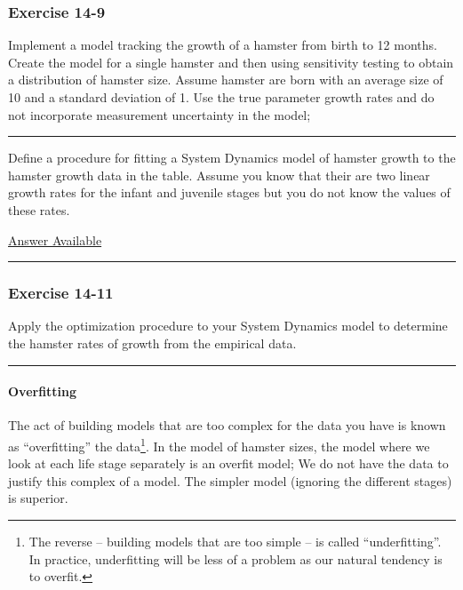 \documentclass[]{memoir}
\begin{document}
\subsubsection{Exercise 14-9}

Implement a model tracking the growth of a hamster from birth to 12
months. Create the model for a single hamster and then using sensitivity
testing to obtain a distribution of hamster size. Assume hamster are
born with an average size of 10 and a standard deviation of 1. Use the
true parameter growth rates and do not incorporate measurement
uncertainty in the model;

\begin{center}\rule{3in}{0.4pt}\end{center}


Define a procedure for fitting a System Dynamics model of hamster growth
to the hamster growth data in the table. Assume you know that their are
two linear growth rates for the infant and juvenile stages but you do
not know the values of these rates.

\hyperref[Ans-14-10]{Answer Available}

\begin{center}\rule{3in}{0.4pt}\end{center}

\subsubsection{Exercise 14-11}

Apply the optimization procedure to your System Dynamics model to
determine the hamster rates of growth from the empirical data.

\begin{center}\rule{3in}{0.4pt}\end{center}

\paragraph{Overfitting}

The act of building models that are too complex for the data you have is
known as ``overfitting'' the data\footnote{The reverse -- building
  models that are too simple -- is called ``underfitting''. In practice,
  underfitting will be less of a problem as our natural tendency is to
  overfit.}. In the model of hamster sizes, the model where we look at
each life stage separately is an overfit model; We do not have the data
to justify this complex of a model. The simpler model (ignoring the
different stages) is superior.
\end{document}
